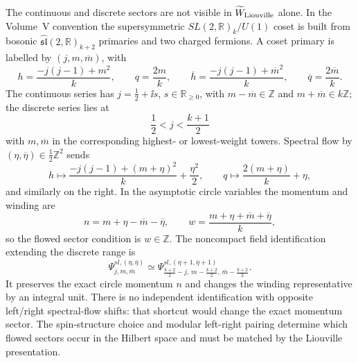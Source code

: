 The continuous and discrete sectors are not visible in
\(\widetilde W_{\rm Liouville}\) alone.  In the Volume~V convention the
supersymmetric \(SL(2,\mathbb R)_k/U(1)\) coset is built from bosonic
\(\widehat{\mathfrak{sl}}(2,\mathbb R)_{k+2}\) primaries and two charged
fermions.  A coset primary is labelled by \((j,m,\overline m)\), with
\[
  h=\frac{-j(j-1)+m^2}{k},
  \qquad
  q=\frac{2m}{k},
  \qquad
  \overline h=\frac{-j(j-1)+\overline m^2}{k},
  \qquad
  \overline q=\frac{2\overline m}{k}.
\]
The continuous series has \(j=\frac12+\ii s\), \(s\in\mathbb R_{\ge0}\),
with \(m-\overline m\in\mathbb Z\) and \(m+\overline m\in k\mathbb Z\);
the discrete series lies at
\[
  \frac12<j<\frac{k+1}{2}
\]
with \(m,\overline m\) in the corresponding highest- or lowest-weight towers.
Spectral flow by \((\eta,\overline\eta)\in\frac12\mathbb Z^2\) sends
\[
  h\mapsto
  \frac{-j(j-1)+(m+\eta)^2}{k}+\frac{\eta^2}{2},
  \qquad
  q\mapsto\frac{2(m+\eta)}{k}+\eta,
\]
and similarly on the right.  In the asymptotic circle variables the momentum
and winding are
\begin{equation}
  n=m+\eta-\overline m-\overline\eta,
  \qquad
  w=\frac{m+\eta+\overline m+\overline\eta}{k},
  \label{eq:n2-cigar-spectral-flow-momentum-winding}
\end{equation}
so the flowed sector condition is \(w\in\mathbb Z\).
The noncompact field identification extending the discrete range is
\begin{equation}
  \Psi^{sl,(\eta,\overline\eta)}_{j,m,\overline m}
  \simeq
  \Psi^{sl,(\eta+1,\overline\eta+1)}
       _{\frac{k+2}{2}-j,\,
         m-\frac{k+2}{2},\,\overline m-\frac{k+2}{2}} .
  \label{eq:n2-cigar-noncompact-field-identification}
\end{equation}
It preserves the exact circle momentum \(n\) and changes the winding
representative by an integral unit.  There is no independent identification
with opposite left/right spectral-flow shifts: that shortcut would change the
exact momentum sector.  The spin-structure choice and modular left-right
pairing determine which flowed sectors occur in the Hilbert space and must be
matched by the Liouville presentation.


